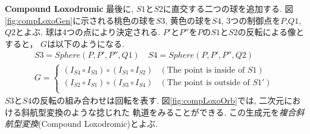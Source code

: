 \noindent\textbf{Compound Loxodromic}
最後に, $S1$と$S2$に直交する二つの球を追加する.
図\ref{fig:compLoxoGen}に示される桃色の球を$S3$, 黄色の球を$S4$,
3つの制御点を$P$,$Q1$,$Q2$とよぶ.
球は4つの点により決定される.
$P'$と$P''$を$P$の$S1$と$S2$の反転による像とすると，
$G$は以下のようになる.
\begin{align*}
S3 = Sphere(P, P', P'', Q1) \quad
S4 = Sphere(P, P', P'', Q2) \\
G =
\begin{cases}
 (I_{S4} \circ I_{S3}) \circ (I_{S1} \circ I_{S2}) & (\text{The point is inside of } S1) \\
 (I_{S2} \circ I_{S1}) \circ (I_{S3} \circ I_{S4}) & (\text{The point is
 outside of } S1')\\
\end{cases}
\end{align*}
$S3$と$S4$の反転の組み合わせは回転を表す.
図\ref{fig:compLoxoOrb}では, 二次元における斜航型変換のような捻じれた
軌道をみることができる.
この生成元を\emph{複合斜航型変換}(Compound Loxodromic)とよぶ.


